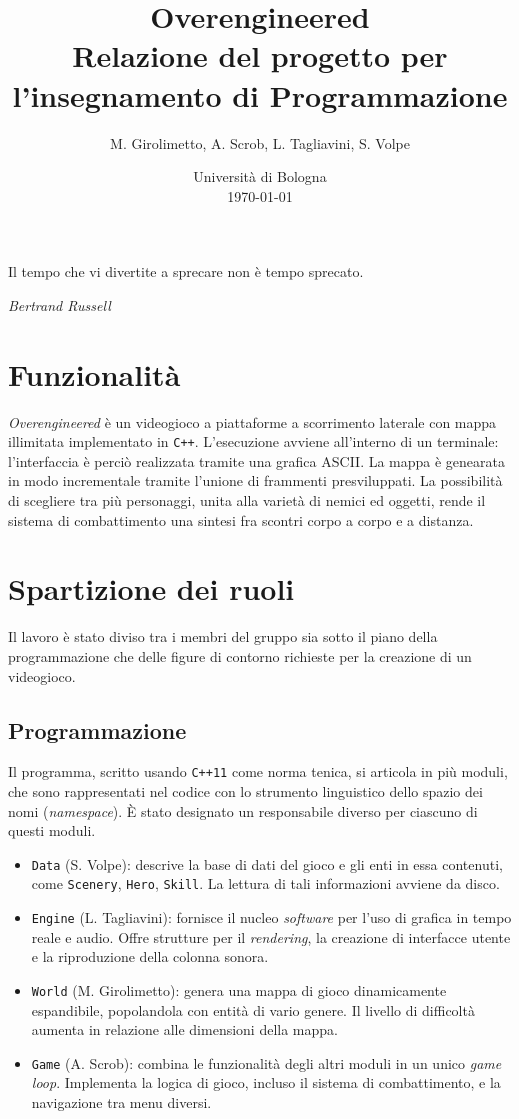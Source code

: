 \documentclass[a4paper]{article}
\title{Overengineered \\
\large Relazione del progetto per l'insegnamento di Programmazione}
\author{
  M. Girolimetto,
  A. Scrob,
  L. Tagliavini,
  S. Volpe
}
\date{
	Universit\`a di Bologna \\
  \today
}
\begin{document}
\maketitle

\epigraph{Il tempo che vi divertite a sprecare non è tempo sprecato.}
{\textit{Bertrand Russell}}

\section{Funzionalit\`a}

\emph{Overengineered} \`e un videogioco a piattaforme a scorrimento laterale con mappa
illimitata implementato in \verb!C++!. L'esecuzione avviene all'interno di un terminale:
l'interfaccia \`e perci\`o realizzata tramite una grafica ASCII. La mappa \`e
genearata in modo incrementale tramite l'unione di frammenti presviluppati. La
possibilit\`a di scegliere tra pi\`u personaggi, unita alla variet\`a di nemici
ed oggetti, rende il sistema di combattimento una sintesi fra scontri corpo a
corpo e a distanza.

\section{Spartizione dei ruoli}

Il lavoro \`e stato diviso tra i membri del gruppo sia sotto il piano della
programmazione che delle figure di contorno richieste per la creazione di un videogioco.

\subsection{Programmazione}

Il programma, scritto usando \verb!C++11! come norma tenica, si articola in
pi\`u moduli, che sono rappresentati nel codice con lo strumento linguistico
dello spazio dei nomi (\emph{namespace}). \`E stato designato un responsabile
diverso per ciascuno di questi moduli.
\begin{itemize}
  \item \verb!Data! (S. Volpe): descrive la base di dati del gioco e gli enti in
    essa contenuti, come \verb!Scenery!, \verb!Hero!, \verb!Skill!. La lettura
    di tali informazioni avviene da disco.
  \item \verb!Engine! (L. Tagliavini): fornisce il nucleo \emph{software} per
    l'uso di grafica in tempo reale e audio. Offre strutture per il
    \emph{rendering}, la creazione di interfacce utente e la riproduzione della
    colonna sonora.
  \item \verb!World! (M. Girolimetto): genera una mappa di gioco dinamicamente
    espandibile, popolandola con entit\`a di vario genere. Il livello di
    difficolt\`a aumenta in relazione alle dimensioni della mappa.
  \item \verb!Game! (A. Scrob): combina le funzionalit\`a degli altri moduli in
    un unico \emph{game loop}. Implementa la logica di gioco, incluso il sistema
    di combattimento, e la navigazione tra menu diversi.
\end{itemize}
\end{document}
